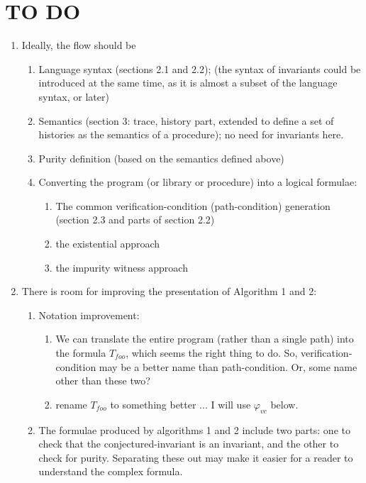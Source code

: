 \section*{TO DO}

\begin{enumerate}

\item Ideally, the flow should be
\begin{enumerate}
\item Language syntax (sections 2.1 and 2.2); (the syntax of invariants could be
introduced at the same time, as it is almost a subset of the language syntax, or later)

\item Semantics (section 3: trace, history part, extended to define a set of histories
as the semantics of a procedure); no need for invariants here.

\item Purity definition (based on the semantics defined above)

\item Converting the program (or library or procedure) into a logical formulae:
\begin{enumerate}
\item The common verification-condition (path-condition) generation (section 2.3
and parts of section 2.2)
\item the existential approach
\item the impurity witness approach
\end{enumerate}

\end{enumerate}


\item There is room for improving the presentation of Algorithm 1 and 2:
\begin{enumerate}

\item Notation improvement:
\begin{enumerate}
\item We can translate the entire program (rather than a single path)
into the formula $T_{foo}$, which seems the right thing to do. So,
verification-condition may be a better name than path-condition.
Or, some name other than these two?
\item rename $T_{foo}$ to something better ... I will use $\varphi_{vc}$
below.
\end{enumerate}

\item The formulae produced by algorithms 1 and 2 include two parts:
one to check that the conjectured-invariant is an invariant, and the
other to check for purity. Separating these out may make it easier for
a reader to understand the complex formula.


\end{enumerate}
\end{enumerate}
